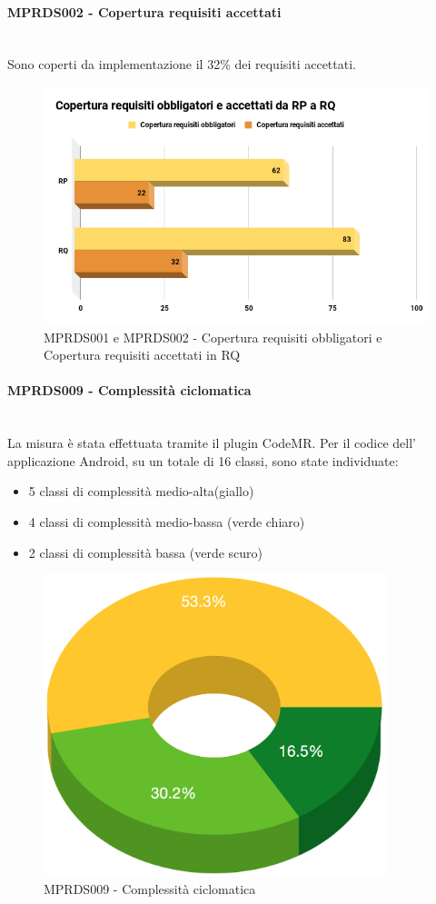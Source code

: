 \paragraph{MPRDS002 - Copertura requisiti accettati}\mbox{}\\[0.4cm]
Sono coperti da implementazione il 32\% dei requisiti accettati.
\begin{figure}[H]
	\centering
	\includegraphics[width=13cm,keepaspectratio]{../includes/pics/Copertura.png}
	\caption{\label{fig:mission}MPRDS001 e MPRDS002 - Copertura requisiti obbligatori e Copertura requisiti accettati in RQ}
\end{figure}
\paragraph{MPRDS009 - Complessità ciclomatica}\mbox{}\\[0.4cm]
La misura è stata effettuata tramite il plugin CodeMR. Per il codice dell' applicazione Android, su un totale di 16 classi, sono state individuate: \begin{itemize}
	\item 5 classi di complessità medio-alta(giallo)
	\item 4 classi di complessità medio-bassa (verde chiaro)
	\item 2 classi di complessità bassa (verde scuro)
\end{itemize}
\begin{figure}[H]
	\centering
	\includegraphics[width=10cm,keepaspectratio]{../includes/pics/complex.png}
	\caption{\label{fig:mission}MPRDS009 - Complessità ciclomatica}
\end{figure}
